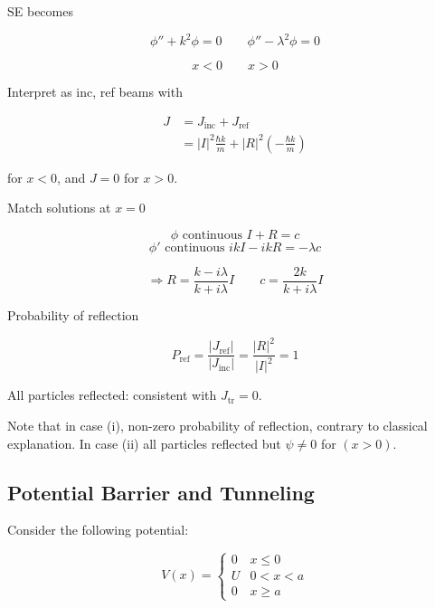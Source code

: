 \documentclass[a4paper]{article}
\begin{document}
\begin{enumerate}
	SE becomes
	
	\[ \phi'' + k^{2} \phi = 0 \qquad  \phi'' - \lambda^{2} \phi = 0 \]
	
	\[ x < 0 \qquad x > 0 \]
	
	Interpret as inc, ref beams with
	
	\begin{align*}
	J & = J_{\text{inc}} + J_{\text{ref}} \\
	& = | I |^{2} \frac{\hbar k}{m} + | R |^{2} \left(  - \frac{\hbar k}{m} \right)  
	\end{align*}
	
	for $ x < 0 $, and $ J = 0 $ for $ x > 0 $.
	
	Match solutions at $ x = 0 $
	
	
	\[ \phi \text{ continuous } I + R = c \]
	\[ \phi' \text{ continuous } ik I - i k R = - \lambda c \]
	
	\[ \Rightarrow  R = \frac{k-i \lambda}{k+ i \lambda} I \qquad c = \frac{2k}{k+i \lambda}I \]
	
	
	Probability of reflection 
	
	\[ P_{\text{ref}} = \frac{| J_{\text{ref}} |}{ | J_{\text{inc}} |} = \frac{|R|^{2}}{| I |^{2}} = 1  \]
	
	All particles reflected: consistent with $ J_{\text{tr}} = 0 $.
	
		
	\end{enumerate}


Note that in case (i), non-zero probability of reflection, contrary to classical explanation. In case (ii) all particles reflected but $ \psi \neq 0 $ for $ (x > 0) $.

\subsection{Potential Barrier and Tunneling}

Consider the following potential:
\begin{center}
\end{center}

\[
V(x) =
\begin{cases}
0 & x \leq 0\\
U & 0 < x < a\\
0 & x \geq a
\end{cases}
\]
\end{document}
